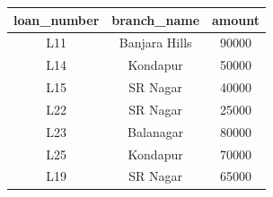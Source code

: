 \begin{tabular}{|c|c|c|}
	\hline
	\textbf{loan\_number} & \textbf{branch\_name} & \textbf{amount} \\ \hline
	L11 & Banjara Hills & 90000 \\ \hline
	L14 & Kondapur      & 50000 \\ \hline
	L15 & SR Nagar      & 40000 \\ \hline
	L22 & SR Nagar      & 25000 \\ \hline
	L23 & Balanagar     & 80000 \\ \hline
	L25 & Kondapur      & 70000 \\ \hline
	L19 & SR Nagar      & 65000 \\ \hline
\end{tabular}